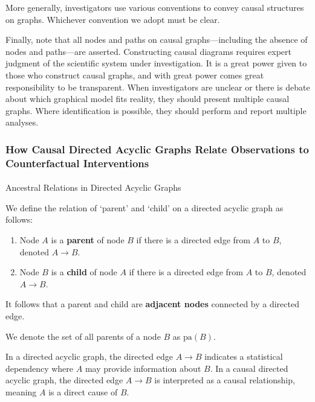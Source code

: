 \documentclass[
  single column]{article}
\makeatletter
\let\oldparagraph\paragraph
\renewcommand{\paragraph}{
    \@ifstar
      \xxxParagraphStar
      \xxxParagraphNoStar
  }
\newcommand{\xxxParagraphStar}[1]{\oldparagraph*{#1}\mbox{}}
\newcommand{\xxxParagraphNoStar}[1]{\oldparagraph{#1}\mbox{}}
\providecommand{\tightlist}{%
  \setlength{\itemsep}{0pt}\setlength{\parskip}{0pt}}\usepackage{longtable,booktabs,array}
\makeatother
\begin{document}
More generally, investigators use various conventions to convey causal
structures on graphs. Whichever convention we adopt must be clear.

Finally, note that all nodes and paths on causal graphs---including the
absence of nodes and paths---are asserted. Constructing causal diagrams
requires expert judgment of the scientific system under investigation.
It is a great power given to those who construct causal graphs, and with
great power comes great responsibility to be transparent. When
investigators are unclear or there is debate about which graphical model
fits reality, they should present multiple causal graphs. Where
identification is possible, they should perform and report multiple
analyses.

\subsubsection{How Causal Directed Acyclic Graphs Relate Observations to
Counterfactual
Interventions}\label{how-causal-directed-acyclic-graphs-relate-observations-to-counterfactual-interventions}

\paragraph{Ancestral Relations in Directed Acyclic
Graphs}\label{ancestral-relations-in-directed-acyclic-graphs}

We define the relation of `parent' and `child' on a directed acyclic
graph as follows:

\begin{enumerate}
\def\labelenumi{\arabic{enumi}.}
\tightlist
\item
  Node \(A\) is a \textbf{parent} of node \(B\) if there is a directed
  edge from \(A\) to \(B\), denoted \(A \rightarrow B\).
\item
  Node \(B\) is a \textbf{child} of node \(A\) if there is a directed
  edge from \(A\) to \(B\), denoted \(A \rightarrow B\).
\end{enumerate}

It follows that a parent and child are \textbf{adjacent nodes} connected
by a directed edge.

We denote the set of all parents of a node \(B\) as \(\text{pa}(B)\).

In a directed acyclic graph, the directed edge \(A \rightarrow B\)
indicates a statistical dependency where \(A\) may provide information
about \(B\). In a causal directed acyclic graph, the directed edge
\(A \rightarrow B\) is interpreted as a causal relationship, meaning
\(A\) is a direct cause of \(B\).
\end{document}
